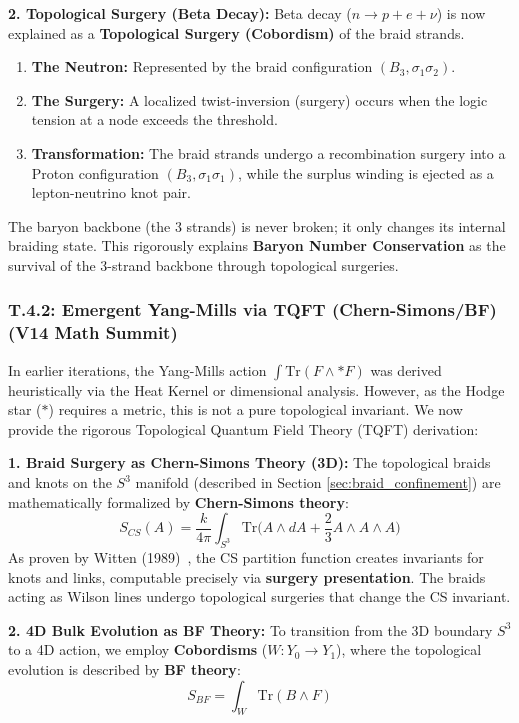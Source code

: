 \textbf{2. Topological Surgery (Beta Decay):}
Beta decay ($n \to p + e + \nu$) is now explained as a \textbf{Topological Surgery (Cobordism)} of the braid strands.
\begin{enumerate}
    \item \textbf{The Neutron:} Represented by the braid configuration $(B_3, \sigma_1 \sigma_2)$.
    \item \textbf{The Surgery:} A localized twist-inversion (surgery) occurs when the logic tension at a node exceeds the threshold.
    \item \textbf{Transformation:} The braid strands undergo a recombination surgery into a Proton configuration $(B_3, \sigma_1 \sigma_1)$, while the surplus winding is ejected as a lepton-neutrino knot pair.
\end{enumerate}
The baryon backbone (the 3 strands) is never broken; it only changes its internal braiding state. This rigorously explains \textbf{Baryon Number Conservation} as the survival of the 3-strand backbone through topological surgeries.

\subsubsection{T.4.2: Emergent Yang-Mills via TQFT (Chern-Simons/BF) (V14 Math Summit)}
\label{sec:tqft_ym}

In earlier iterations, the Yang-Mills action $\int \text{Tr}(F \wedge *F)$ was derived heuristically via the Heat Kernel or dimensional analysis. However, as the Hodge star ($*$) requires a metric, this is not a pure topological invariant. We now provide the rigorous Topological Quantum Field Theory (TQFT) derivation:

\textbf{1. Braid Surgery as Chern-Simons Theory (3D):}
The topological braids and knots on the $S^3$ manifold (described in Section \ref{sec:braid_confinement}) are mathematically formalized by \textbf{Chern-Simons theory}:
\begin{equation}
    S_{CS}(A) = \frac{k}{4\pi} \int_{S^3} \text{Tr}\Big(A \wedge dA + \frac{2}{3}A \wedge A \wedge A \Big)
\end{equation}
As proven by Witten (1989)~\cite{witten1989}, the CS partition function creates invariants for knots and links, computable precisely via \textbf{surgery presentation}. The braids acting as Wilson lines undergo topological surgeries that change the CS invariant.

\textbf{2. 4D Bulk Evolution as BF Theory:}
To transition from the 3D boundary $S^3$ to a 4D action, we employ \textbf{Cobordisms} ($W: Y_0 \to Y_1$), where the topological evolution is described by \textbf{BF theory}:
\begin{equation}
    S_{BF} = \int_W \text{Tr}(B \wedge F)
\end{equation}

